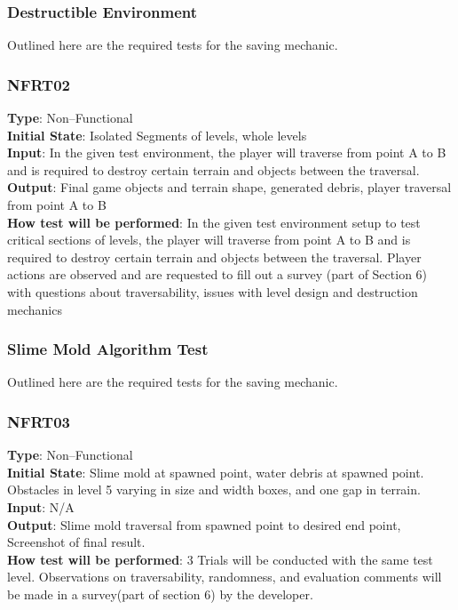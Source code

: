 \documentclass[12pt, titlepage]{article}
\begin{document}
\subsubsection{Destructible Environment}

Outlined here are the required tests for the saving mechanic.

\subsubsection{NFRT02}

\textbf{Type}: Non--Functional\\
\textbf{Initial State}: Isolated Segments of levels, whole levels\\
\textbf{Input}: In the given test environment, the player will traverse from point A to B and is required to destroy certain terrain and objects between the traversal.\\
\textbf{Output}: Final game objects and terrain shape, generated debris, player traversal from point A to B\\
\textbf{How test will be performed}: In the given test environment setup to test critical sections of levels, the player will traverse from point A to B and is required to destroy certain terrain and objects between the traversal. Player actions are observed and are requested to fill out a survey (part of Section 6) with questions about traversability, issues with level design and destruction mechanics\\
\subsubsection{Slime Mold Algorithm Test}

Outlined here are the required tests for the saving mechanic.

\subsubsection{NFRT03}

\textbf{Type}: Non--Functional\\
\textbf{Initial State}: Slime mold at spawned point, water debris at spawned point. Obstacles in level 5 varying in size and width boxes, and one gap in terrain.\\
\textbf{Input}: N/A\\
\textbf{Output}: Slime mold traversal from spawned point to desired end point, Screenshot of final result.\\
\textbf{How test will be performed}: 3 Trials will be conducted with the same test level. Observations on traversability, randomness, and evaluation comments will be made in a survey(part of section 6) by the developer.\\
\end{document}
